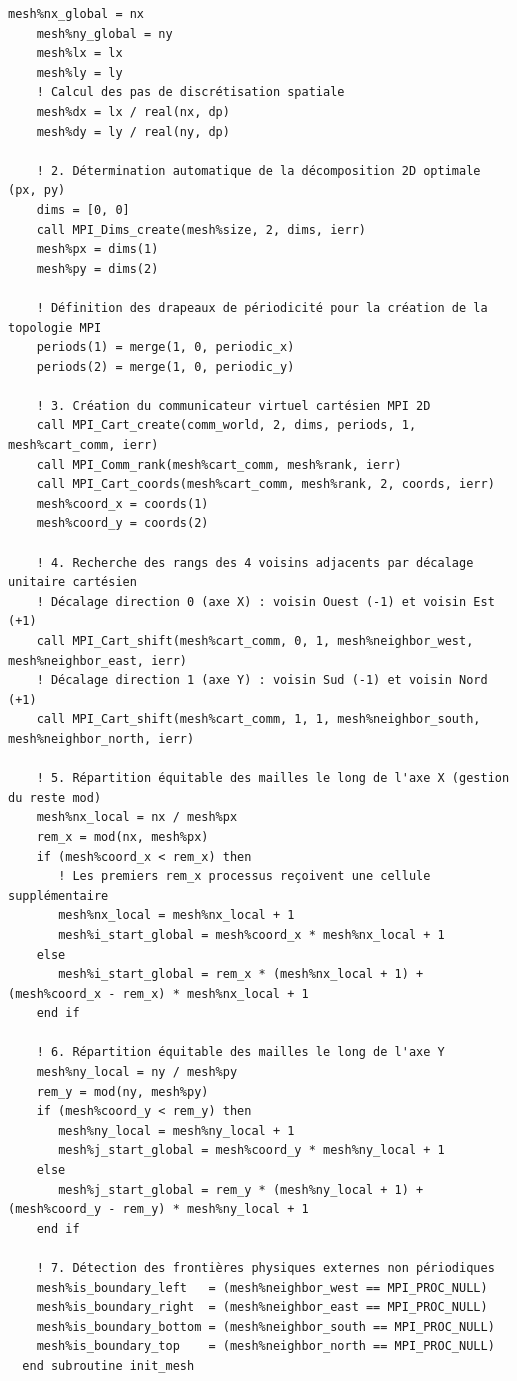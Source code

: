 \documentclass[10pt,a4paper,oneside]{book}
\begin{document}
\begin{lstlisting}[language={[95]Fortran}]
    mesh%nx_global = nx
    mesh%ny_global = ny
    mesh%lx = lx
    mesh%ly = ly
    ! Calcul des pas de discrétisation spatiale
    mesh%dx = lx / real(nx, dp)
    mesh%dy = ly / real(ny, dp)

    ! 2. Détermination automatique de la décomposition 2D optimale (px, py)
    dims = [0, 0]
    call MPI_Dims_create(mesh%size, 2, dims, ierr)
    mesh%px = dims(1)
    mesh%py = dims(2)

    ! Définition des drapeaux de périodicité pour la création de la topologie MPI
    periods(1) = merge(1, 0, periodic_x)
    periods(2) = merge(1, 0, periodic_y)

    ! 3. Création du communicateur virtuel cartésien MPI 2D
    call MPI_Cart_create(comm_world, 2, dims, periods, 1, mesh%cart_comm, ierr)
    call MPI_Comm_rank(mesh%cart_comm, mesh%rank, ierr)
    call MPI_Cart_coords(mesh%cart_comm, mesh%rank, 2, coords, ierr)
    mesh%coord_x = coords(1)
    mesh%coord_y = coords(2)

    ! 4. Recherche des rangs des 4 voisins adjacents par décalage unitaire cartésien
    ! Décalage direction 0 (axe X) : voisin Ouest (-1) et voisin Est (+1)
    call MPI_Cart_shift(mesh%cart_comm, 0, 1, mesh%neighbor_west, mesh%neighbor_east, ierr)
    ! Décalage direction 1 (axe Y) : voisin Sud (-1) et voisin Nord (+1)
    call MPI_Cart_shift(mesh%cart_comm, 1, 1, mesh%neighbor_south, mesh%neighbor_north, ierr)

    ! 5. Répartition équitable des mailles le long de l'axe X (gestion du reste mod)
    mesh%nx_local = nx / mesh%px
    rem_x = mod(nx, mesh%px)
    if (mesh%coord_x < rem_x) then
       ! Les premiers rem_x processus reçoivent une cellule supplémentaire
       mesh%nx_local = mesh%nx_local + 1
       mesh%i_start_global = mesh%coord_x * mesh%nx_local + 1
    else
       mesh%i_start_global = rem_x * (mesh%nx_local + 1) + (mesh%coord_x - rem_x) * mesh%nx_local + 1
    end if

    ! 6. Répartition équitable des mailles le long de l'axe Y
    mesh%ny_local = ny / mesh%py
    rem_y = mod(ny, mesh%py)
    if (mesh%coord_y < rem_y) then
       mesh%ny_local = mesh%ny_local + 1
       mesh%j_start_global = mesh%coord_y * mesh%ny_local + 1
    else
       mesh%j_start_global = rem_y * (mesh%ny_local + 1) + (mesh%coord_y - rem_y) * mesh%ny_local + 1
    end if

    ! 7. Détection des frontières physiques externes non périodiques
    mesh%is_boundary_left   = (mesh%neighbor_west == MPI_PROC_NULL)
    mesh%is_boundary_right  = (mesh%neighbor_east == MPI_PROC_NULL)
    mesh%is_boundary_bottom = (mesh%neighbor_south == MPI_PROC_NULL)
    mesh%is_boundary_top    = (mesh%neighbor_north == MPI_PROC_NULL)
  end subroutine init_mesh


\end{lstlisting}
\end{document}
